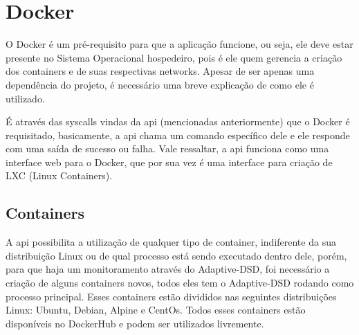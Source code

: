 \section{Docker}
\label{sec:docker}

O Docker é um pré-requisito para que a aplicação funcione, ou seja, ele deve estar presente no Sistema Operacional hospedeiro, pois é ele quem gerencia a criação dos containers e de suas respectivas networks. Apesar de ser apenas uma dependência do projeto, é necessário uma breve explicação de como ele é utilizado.

É através das syscalls vindas da api (mencionadas anteriormente) que o Docker é requisitado, basicamente, a api chama um comando específico dele e ele responde com uma saída de sucesso ou falha. Vale ressaltar, a api funciona como uma interface web para o Docker, que por sua vez é uma interface para criação de LXC (Linux Containers).

\subsection{Containers}
\label{subsec:containers}

A api possibilita a utilização de qualquer tipo de container, indiferente da sua distribuição Linux ou de qual processo está sendo executado dentro dele, porém, para que haja um monitoramento através do Adaptive-DSD, foi necessário a criação de alguns containers novos, todos eles tem o Adaptive-DSD rodando como processo principal. Esses containers estão divididos nas seguintes distribuições Linux: Ubuntu, Debian, Alpine e CentOs. Todos esses containers estão disponíveis no DockerHub e podem ser utilizados livremente.